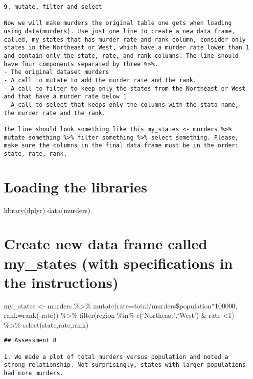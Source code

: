 \documentclass[
]{article}
\begin{document}
\begin{verbatim}
9. mutate, filter and select

Now we will make murders the original table one gets when loading using data(murders). Use just one line to create a new data frame, called, my_states that has murder rate and rank column, consider only states in the Northeast or West, which have a murder rate lower than 1 and contain only the state, rate, and rank columns. The line should have four components separated by three %>%.
- The original dataset murders
- A call to mutate to add the murder rate and the rank.
- A call to filter to keep only the states from the Northeast or West and that have a murder rate below 1
- A call to select that keeps only the columns with the stata name, the murder rate and the rank.

The line should look something like this my_states <- murders %>% mutate something %>% filter something %>% select something. Please, make sure the columns in the final data frame must be in the order: state, rate, rank.
\end{verbatim}

\hypertarget{loading-the-libraries}{%
\section{Loading the libraries}\label{loading-the-libraries}}

library(dplyr) data(murders)

\hypertarget{create-new-data-frame-called-my_states-with-specifications-in-the-instructions}{%
\section{Create new data frame called my\_states (with specifications in
the
instructions)}\label{create-new-data-frame-called-my_states-with-specifications-in-the-instructions}}

my\_states \textless- murders \%\textgreater\%
mutate(rate=total/murders\$population*100000, rank=rank(-rate))
\%\textgreater\% filter(region \%in\% c(`Northeast',`West') \& rate
\textless1) \%\textgreater\% select(state,rate,rank)

\begin{verbatim}
## Assessment 8

1. We made a plot of total murders versus population and noted a strong relationship. Not surprisingly, states with larger populations had more murders.
\end{verbatim}
\end{document}
